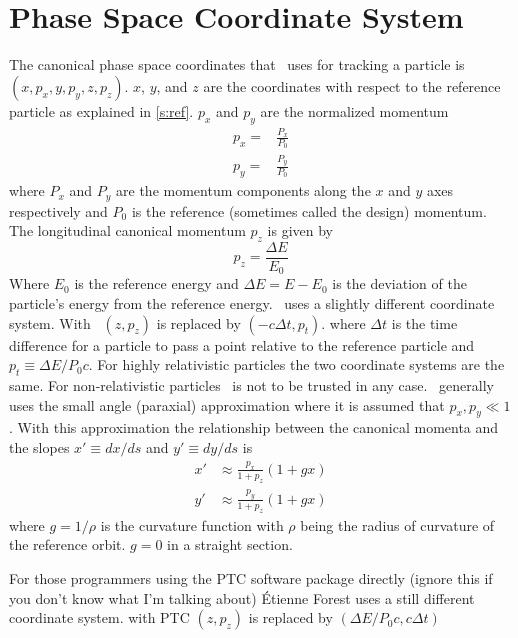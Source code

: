 \section{Phase Space Coordinate System}

The canonical phase space coordinates that \bmad\ uses for tracking a
particle is $(x, p_x, y, p_y, z, p_z)$. $x$, $y$, and $z$ are the
coordinates with respect to the reference particle as explained in
\ref{s:ref}. $p_x$ and $p_y$ are the normalized momentum
\begin{align}
  p_x = &\frac{P_x}{P_0} \\
  p_y = &\frac{P_y}{P_0}
\end{align}
where $P_x$ and $P_y$ are the momentum components along the $x$ and
$y$ axes respectively and $P_0$ is the reference (sometimes called the
design) momentum. The longitudinal canonical momentum $p_z$ is given by
\begin{equation}
  p_z = \frac{\Delta E}{E_0}
\end{equation}
Where $E_0$ is the reference energy and $\Delta E = E - E_0$ is the
deviation of the particle's energy from the reference energy. \mad\ uses
a slightly different coordinate system. With \mad\ $(z, p_z)$ is
replaced by $(-c\Delta t, p_t)$. where $\Delta t$ is the time
difference for a particle to pass a point relative to the reference
particle and $p_t \equiv \Delta E / P_0 c$. For highly relativistic
particles the two coordinate systems are the same. For
non-relativistic particles \bmad\ is not to be trusted in any
case. \bmad\ generally uses the small angle (paraxial) approximation
where it is assumed that $p_x, p_y \ll 1$. With this approximation the
relationship between the canonical momenta and the slopes $x' \equiv dx/ds$
and $y' \equiv dy/ds$ is
\begin{align}
  x' &\approx \frac{p_x}{1 + p_z} (1 + g x) \\
  y' &\approx \frac{p_y}{1 + p_z} (1 + g x) 
\end{align}
where $g = 1/\rho$ is the curvature function with $\rho$ being the radius
of curvature of the reference orbit. $g = 0$ in a straight section.

For those programmers using the PTC software package directly (ignore
this if you don't know what I'm talking about) \'Etienne Forest uses a still
different coordinate system. with PTC $(z, p_z)$ is replaced by
$(\Delta E/P_0 c, c \Delta t)$